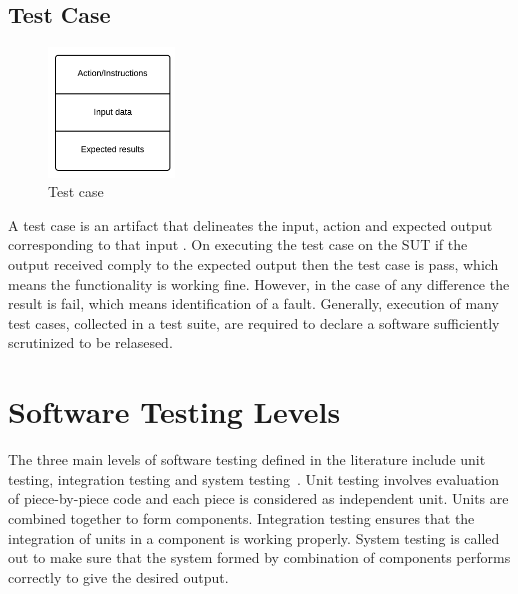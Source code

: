 \subsection{Test Case}
\begin{figure}
  \vspace{-20pt}
  \begin{center}
    \includegraphics[width=0.30\textwidth]{chapter2/testCase.png}
  \end{center}
  \vspace{-20pt}
  \caption{Test case}
  \label{fig:testCase}
  \vspace{-10pt}
\end{figure}
A test case is an artifact that delineates the input, action and expected output corresponding to that input \cite{ahmed2010software}. On executing the test case on the SUT if the output received comply to the expected output then the test case is pass, which means the functionality is working fine. However, in the case of any difference the result is fail, which means identification of a fault. Generally, execution of many test cases, collected in a test suite, are required to declare a software sufficiently scrutinized to be relasesed.

\section{Software Testing Levels}
The three main levels of software testing defined in the literature include unit testing, integration testing and system testing~\cite{chilenski1994applicability}. Unit testing involves evaluation of piece-by-piece code and each piece is considered as independent unit. Units are combined together to form components. Integration testing ensures that the integration of units in a component is working properly. System testing is called out to make sure that the system formed by combination of components performs correctly to give the desired output.


